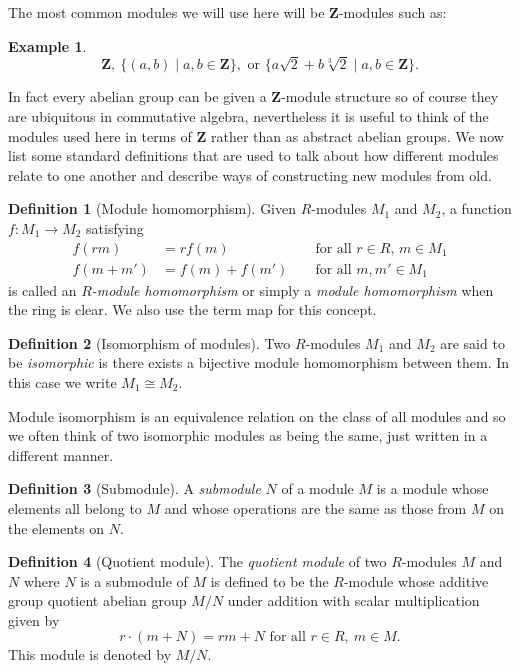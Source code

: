 \documentclass[12pt,a4paper,abstracton,bibtotoc]{scrreprt}
\theoremstyle{definition}
\newtheorem{defn}{Definition}
\newtheorem{ex}{Example}
\newcommand{\ZZ}{\mathbf{Z}}
\begin{document}
The most common modules we will use here will be $\ZZ$-modules such as:
\begin{ex}
\[
\ZZ,\ \{(a,b)\mid a,b\in \ZZ\},\text{ or }\{a\sqrt{2} + b\sqrt[3]{2}\mid a,b\in \ZZ\}.
\]
\end{ex}
In fact every abelian group can be given a $\ZZ$-module structure so of course they are ubiquitous in commutative algebra, nevertheless it is useful to think of the modules used here in terms of $\ZZ$ rather than as abstract abelian groups.
We now list some standard definitions that are used to talk about how different modules relate to one another and describe ways of constructing new modules from old.

\begin{defn}[Module homomorphism]
Given $R$-modules $M_1$ and $M_2$, a function $f\colon M_1 \to M_2$ satisfying
\begin{align*}
f(rm) &= rf(m) &&\text{ for all $r\in R$, $m\in M_1$}\\
f(m + m') &= f(m) + f(m')&&\text{ for all $m,m'\in M_1$}
\end{align*}
is called an \emph{$R$-module homomorphism} or simply a \emph{module homomorphism} when the ring is clear.
We also use the term map for this concept.
\end{defn}

\begin{defn}[Isomorphism of modules]
Two $R$-modules $M_1$ and $M_2$ are said to be \emph{isomorphic} is there exists a bijective module homomorphism between them. 
In this case we write $M_1\cong M_2$.
\end{defn}

Module isomorphism is an equivalence relation on the class of all modules and so we often think of two isomorphic modules as being the same, just written in a different manner.

\begin{defn}[Submodule]
A \emph{submodule} $N$ of a module $M$ is a module whose elements all belong to $M$ and whose operations are the same as those from $M$ on the elements on $N$.
\end{defn}

\begin{defn}[Quotient module]
The \emph{quotient module} of two $R$-modules $M$ and $N$ where $N$ is a submodule of $M$ is defined to be the $R$-module whose additive group quotient abelian group $M/N$ under addition with scalar multiplication given by
\[
r\cdot(m + N) = rm + N\text{ for all }r\in R,\ m\in M.
\]
This module is denoted by $M/N$.
\end{defn}
\end{document}
